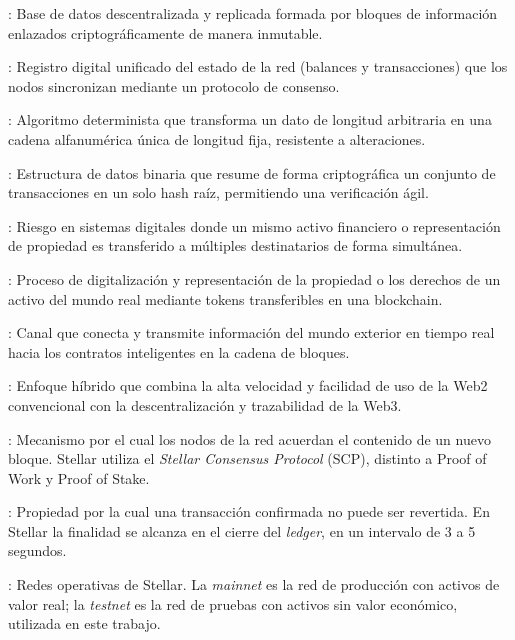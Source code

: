 \begin{description}\setlength{\itemsep}{2pt}
\item[Blockchain (cadena de bloques)]: Base de datos descentralizada y replicada formada por bloques de
información enlazados criptográficamente de manera inmutable.
\item[Ledger (libro mayor)]: Registro digital unificado del estado de la red (balances y transacciones) que
los nodos sincronizan mediante un protocolo de consenso.
\item[Hash criptográfico]: Algoritmo determinista que transforma un dato de longitud arbitraria en una cadena
alfanumérica única de longitud fija, resistente a alteraciones.
\item[Árbol de Merkle]: Estructura de datos binaria que resume de forma criptográfica un conjunto de
transacciones en un solo hash raíz, permitiendo una verificación ágil.
\item[Doble gasto]: Riesgo en sistemas digitales donde un mismo activo financiero o representación de
propiedad es transferido a múltiples destinatarios de forma simultánea.
\item[Tokenización]: Proceso de digitalización y representación de la propiedad o los derechos de un activo
del mundo real mediante tokens transferibles en una blockchain.
\item[Oráculo (\textit{Oracle})]: Canal que conecta y transmite información del mundo exterior en tiempo real
hacia los contratos inteligentes en la cadena de bloques.
\item[Web2.5]: Enfoque híbrido que combina la alta velocidad y facilidad de uso de la Web2 convencional con
la descentralización y trazabilidad de la Web3.
\item[Consenso]: Mecanismo por el cual los nodos de la red acuerdan el contenido de un nuevo bloque. Stellar
utiliza el \textit{Stellar Consensus Protocol} (SCP), distinto a Proof of Work y Proof of Stake.
\item[Finalidad (\textit{finality})]: Propiedad por la cual una transacción confirmada no puede ser
revertida. En Stellar la finalidad se alcanza en el cierre del \textit{ledger}, en un intervalo de 3 a 5
segundos.
\item[Mainnet / Testnet]: Redes operativas de Stellar. La \textit{mainnet} es la red de producción con
activos de valor real; la \textit{testnet} es la red de pruebas con activos sin valor económico, utilizada en
este trabajo.
\end{description}

